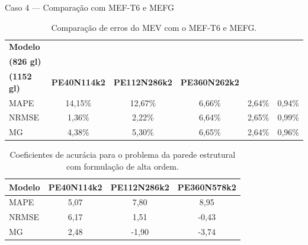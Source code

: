 \documentclass[aspectratio=169]{beamer}
\begin{document}
{\begin{frame}{Caso 4 --- Comparação com MEF-T6 e MEFG}
  \centering
  \begin{table}[htbp]
    \centering
    \caption{Comparação de erros do MEV com o MEF-T6 e MEFG.}
    \small %
    \begin{tabular}{lccccc}
        \toprule
        \textbf{Modelo} & 
        \makecell{\textbf{MEF}\\\textbf{(826 gl)}} & 
        \makecell{\textbf{MEFG}\\\textbf{(1152 gl)}} & 
        \textbf{PE40N114k2} & 
        \textbf{PE112N286k2} & 
        \textbf{PE360N262k2} \\
        \midrule
        MAPE  & 14,15\% & 12,67\% & 6,66\% & 2,64\% & 0,94\% \\
        NRMSE & 1,36\%  & 2,22\%  & 6,64\% & 2,65\% & 0,99\% \\
        MG    & 4,38\%  & 5,30\%  & 6,65\% & 2,64\% & 0,96\% \\
        \bottomrule
    \end{tabular}
\end{table}
\begin{table}[htbp]
    \centering
    \caption{Coeficientes de acurácia para o problema da parede estrutural com formulação de alta ordem.}
    \small %
    \begin{tabular}{lccc}
        \toprule
        \textbf{Modelo} & \textbf{PE40N114k2} & \textbf{PE112N286k2} & \textbf{PE360N578k2} \\
        \midrule
        MAPE  & 5,07 & 7,80  & 8,95  \\
        NRMSE & 6,17 & 1,51  & -0,43 \\
        MG    & 2,48 & -1,90 & -3,74 \\
        \bottomrule
    \end{tabular}
\end{table}
\end{frame}

}
\end{document}
